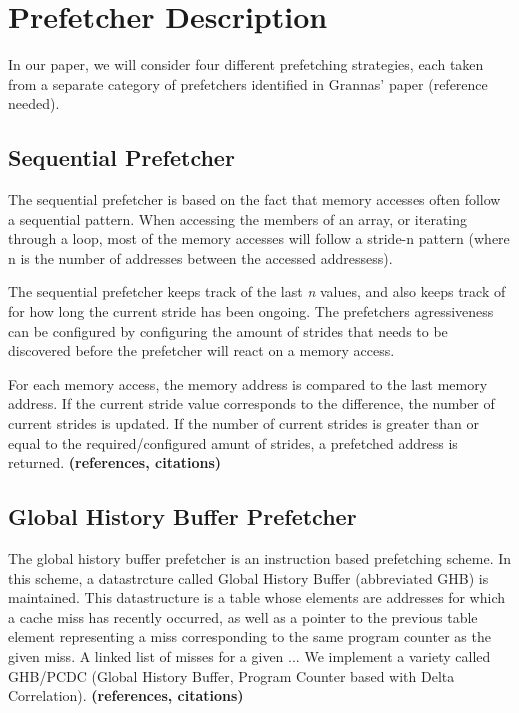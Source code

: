 
\section{Prefetcher Description}
\label{sec:prefetcherDescription}

In our paper, we will consider four different prefetching strategies,
each taken from a separate category of prefetchers identified in
Grannas' paper (reference needed).

\subsection{Sequential Prefetcher}
\label{sec:sequentialPrefetcher}
The sequential prefetcher is based on the fact that memory accesses
often follow a sequential pattern. When accessing the members of an
array, or iterating through a loop, most of the memory accesses will
follow a stride-n pattern (where n is the number of addresses between
the accessed addressess).

The sequential prefetcher keeps track of the last \emph{n} values, and
also keeps track of for how long the current stride has been
ongoing. The prefetchers agressiveness can be configured by
configuring the amount of strides that needs to be discovered before
the prefetcher will react on a memory access.

For each memory access, the memory address is compared to the last
memory address. If the current stride value corresponds to the
difference, the number of current strides is updated. If the number of
current strides is greater than or equal to the required/configured
amunt of strides, a prefetched address is returned.  {\bf (references,
  citations)}

\subsection{Global History Buffer Prefetcher}
\label{sec:ghbPcdcPrefetcher}
The global history buffer prefetcher is an instruction based
prefetching scheme. In this scheme, a datastrcture called Global
History Buffer (abbreviated GHB) is maintained. This datastructure is
a table whose elements are addresses for which a cache miss has
recently occurred, as well as a pointer to the previous table element
representing a miss corresponding to the same program counter as the
given miss. A linked list of misses for a given ... We implement a
variety called GHB/PCDC (Global History Buffer, Program Counter based
with Delta Correlation).  {\bf (references, citations)}

